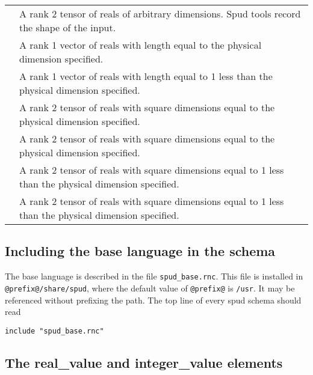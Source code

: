 \documentclass[a4paper, 11pt]{book}
\begin{document}
\begin{longtable}{lp{8cm}}
\lstinline*real_tensor* & A rank 2 tensor of reals of arbitrary dimensions.  Spud tools record the shape of the input. \\
\lstinline*real_dim_vector* & A rank 1 vector of reals with length equal to the physical dimension specified. \\
\lstinline*real_dim_minus_one_vector* & A rank 1 vector of reals with length equal to 1 less than the physical dimension specified. \\
\lstinline*real_dim_tensor* & A rank 2 tensor of reals with square dimensions equal to the physical dimension specified. \\
\lstinline*real_dim_symmetric_tensor* & A rank 2 tensor of reals with square dimensions equal to the physical dimension specified. \\
\lstinline*real_dim_minus_one_tensor* & A rank 2 tensor of reals with square dimensions equal to 1 less than the physical dimension specified. \\
\lstinline*real_dim_minus_one_symmetric_tensor* & A rank 2 tensor of reals with square dimensions equal to 1 less than the physical dimension specified.
\end{longtable}

\subsection{Including the base language in the schema}
The base language is described in the file \verb+spud_base.rnc+.
This file is installed in \verb+@prefix@/share/spud+, where the default
value of \verb+@prefix@+ is \verb+/usr+. It may be referenced
without prefixing the path. The top line of every spud schema should read
\begin{verbatim}
include "spud_base.rnc"
\end{verbatim}

\subsection{The real\_value and integer\_value elements}
\end{document}
